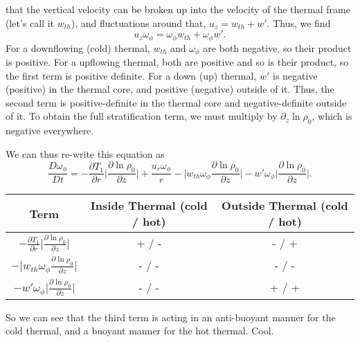 \documentclass[onecolumn, amsmath, amsfonts, amssymb]{aastex62}
\begin{document}
that the vertical velocity can be broken up into the velocity of the thermal frame
(let's call it $w_{th}$), and fluctuations around that, $u_z = w_{th} + w'$. Thus, we find
$$
u_z\omega_\phi = \omega_\phi w_{th} + \omega_\phi w'.
$$
For a downflowing (cold) thermal, $w_{th}$ and $\omega_\phi$ are both negative, so their
product is positive. For a upflowing thermal, both are positive and so is their product, so
the first term is positive definite. For a down (up) thermal, $w'$ is negative (positive) in the
thermal core, and positive (negative) outside of it. Thus, the second term is positive-definite
in the thermal core and negative-definite outside of it. To obtain the full stratification
term, we must multiply by $\partial_z\ln\rho_0$, which is negative everywhere.

We can thus re-write this equation as
\begin{equation}
\frac{D \omega_\phi}{D t} = -\frac{\partial T_1}{\partial r}\bigg|\frac{\partial\ln\rho_0}{\partial z}\bigg|
+ \frac{u_r\omega_\phi}{r} - \bigg| w_{th} \omega_\phi \frac{\partial\ln\rho_0}{\partial z}\bigg|
- w' \omega_\phi \bigg|\frac{\partial\ln\rho_0}{\partial z}\bigg|.
\end{equation}

\begin{table}
\label{table:signs}
\begin{center}
\begin{tabular}{ c c c }
\hline																	
Term	& Inside Thermal (cold / hot) 	& Outside Thermal (cold / hot)\\
\hline
$-\frac{\partial T_1}{\partial r}\bigg|\frac{\partial\ln\rho_0}{\partial z}\bigg|$ 	& + / - & - / + \\
$-\bigg| w_{th} \omega_\phi \frac{\partial\ln\rho_0}{\partial z}\bigg|$ 			& - / - & - / - \\
$-w' \omega_\phi \bigg|\frac{\partial\ln\rho_0}{\partial z}\bigg|$					& - / - & + / + \\	
\hline																	
\end{tabular}
\end{center}
\end{table}

So we can see that the third term is acting in an anti-buoyant manner for the cold thermal,
and a buoyant manner for the hot thermal. Cool.



\end{document}
